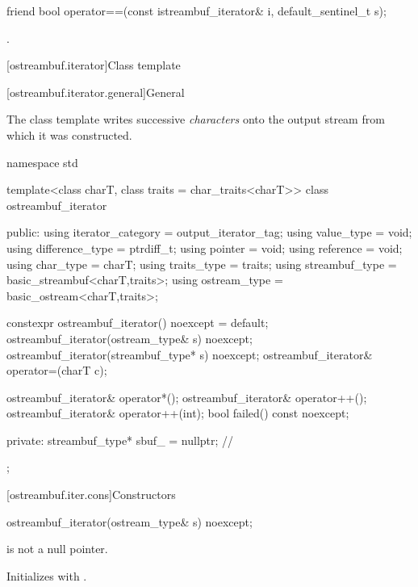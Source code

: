 %
\begin{itemdecl}
friend bool operator==(const istreambuf_iterator& i, default_sentinel_t s);
\end{itemdecl}

\begin{itemdescr}
\pnum
\returns
{}.
\end{itemdescr}

[ostreambuf.iterator]{Class template }

[ostreambuf.iterator.general]{General}

\pnum
The class template 
writes successive \textit{characters} onto the output stream
from which it was constructed.

%
\begin{codeblock}
namespace std {
  template<class charT, class traits = char_traits<charT>>
  class ostreambuf_iterator {
  public:
    using iterator_category = output_iterator_tag;
    using value_type        = void;
    using difference_type   = ptrdiff_t;
    using pointer           = void;
    using reference         = void;
    using char_type         = charT;
    using traits_type       = traits;
    using streambuf_type    = basic_streambuf<charT,traits>;
    using ostream_type      = basic_ostream<charT,traits>;

    constexpr ostreambuf_iterator() noexcept = default;
    ostreambuf_iterator(ostream_type& s) noexcept;
    ostreambuf_iterator(streambuf_type* s) noexcept;
    ostreambuf_iterator& operator=(charT c);

    ostreambuf_iterator& operator*();
    ostreambuf_iterator& operator++();
    ostreambuf_iterator& operator++(int);
    bool failed() const noexcept;

  private:
    streambuf_type* sbuf_ = nullptr;    // \expos
  };
}
\end{codeblock}

[ostreambuf.iter.cons]{Constructors}

%
\begin{itemdecl}
ostreambuf_iterator(ostream_type& s) noexcept;
\end{itemdecl}

\begin{itemdescr}
\pnum
\expects
{}
is not a null pointer.

\pnum
\effects
Initializes  with .
\end{itemdescr}


